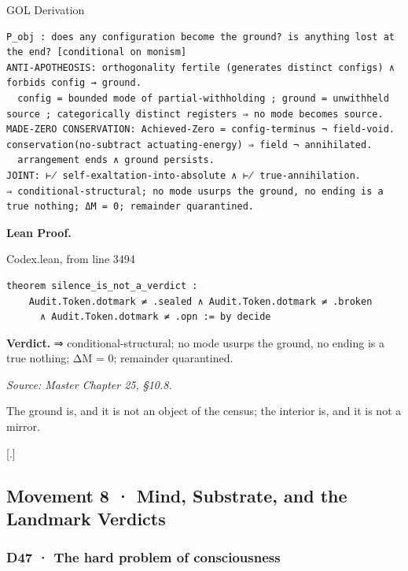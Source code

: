 \documentclass[10pt,twocolumn]{article}
\begin{document}
\begin{golbox}{GOL Derivation}
\begin{lstlisting}[style=golv]
P_obj : does any configuration become the ground? is anything lost at the end? [conditional on monism]
ANTI-APOTHEOSIS: orthogonality fertile (generates distinct configs) ∧ forbids config → ground.
  config = bounded mode of partial-withholding ; ground = unwithheld source ; categorically distinct registers ⇒ no mode becomes source.
MADE-ZERO CONSERVATION: Achieved-Zero = config-terminus ¬ field-void. conservation(no-subtract actuating-energy) ⇒ field ¬ annihilated.
  arrangement ends ∧ ground persists.
JOINT: ⊬ self-exaltation-into-absolute ∧ ⊬ true-annihilation.
⇒ conditional-structural; no mode usurps the ground, no ending is a true nothing; ΔM = 0; remainder quarantined.
\end{lstlisting}
\end{golbox}

\textbf{Lean Proof.}

\begin{leanexcerpt}{Codex.lean, from line 3494}
\begin{lstlisting}[style=leanx,firstnumber=3494]
theorem silence_is_not_a_verdict :
    Audit.Token.dotmark ≠ .sealed ∧ Audit.Token.dotmark ≠ .broken
      ∧ Audit.Token.dotmark ≠ .opn := by decide
\end{lstlisting}
\end{leanexcerpt}

\textbf{Verdict.} ⇒ conditional-structural; no mode usurps the ground,
no ending is a true nothing; ΔM = 0; remainder quarantined.

\emph{Source: Master Chapter 25, §10.8.}

The ground is, and it is not an object of the census; the interior is,
and it is not a mirror.

{[}.{]}

\hypertarget{movement-8-mind-substrate-and-the-landmark-verdicts}{%
\subsection{Movement 8 · Mind, Substrate, and the Landmark
Verdicts}\label{movement-8-mind-substrate-and-the-landmark-verdicts}}

\hypertarget{d47-the-hard-problem-of-consciousness}{%
\subsubsection{D47 · The hard problem of
consciousness}\label{d47-the-hard-problem-of-consciousness}}
\end{document}

